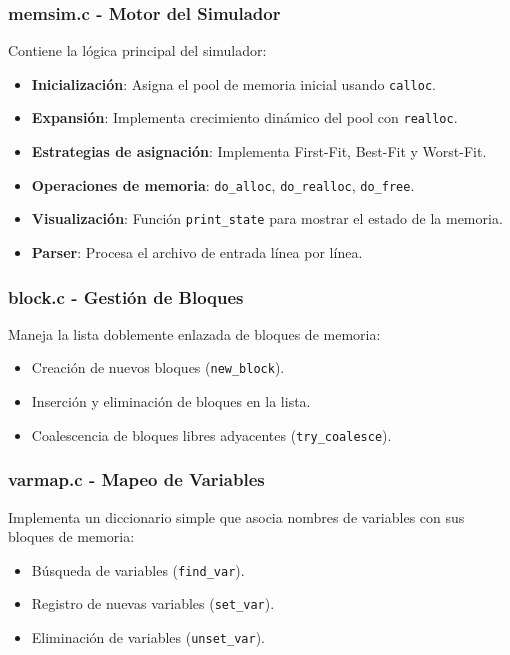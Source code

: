 \documentclass[12pt,a4paper]{article}
\begin{document}
\subsubsection{memsim.c - Motor del Simulador}

Contiene la lógica principal del simulador:
\begin{itemize}
    \item \textbf{Inicialización}: Asigna el pool de memoria inicial usando \texttt{calloc}.
    \item \textbf{Expansión}: Implementa crecimiento dinámico del pool con \texttt{realloc}.
    \item \textbf{Estrategias de asignación}: Implementa First-Fit, Best-Fit y Worst-Fit.
    \item \textbf{Operaciones de memoria}: \texttt{do\_alloc}, \texttt{do\_realloc}, \texttt{do\_free}.
    \item \textbf{Visualización}: Función \texttt{print\_state} para mostrar el estado de la memoria.
    \item \textbf{Parser}: Procesa el archivo de entrada línea por línea.
\end{itemize}

\subsubsection{block.c - Gestión de Bloques}

Maneja la lista doblemente enlazada de bloques de memoria:
\begin{itemize}
    \item Creación de nuevos bloques (\texttt{new\_block}).
    \item Inserción y eliminación de bloques en la lista.
    \item Coalescencia de bloques libres adyacentes (\texttt{try\_coalesce}).
\end{itemize}

\subsubsection{varmap.c - Mapeo de Variables}

Implementa un diccionario simple que asocia nombres de variables con sus bloques de memoria:
\begin{itemize}
    \item Búsqueda de variables (\texttt{find\_var}).
    \item Registro de nuevas variables (\texttt{set\_var}).
    \item Eliminación de variables (\texttt{unset\_var}).
\end{itemize}
\end{document}
